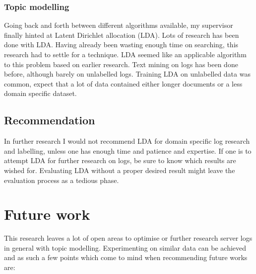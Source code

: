 \subsubsection{Topic modelling}
Going back and forth between different algorithms available, my supervisor finally hinted at Latent Dirichlet allocation (LDA). Lots of research has been done with LDA. Having already been wasting enough time on searching, this research had to settle for a technique. LDA seemed like an applicable algorithm to this problem based on earlier research. Text mining on logs has been done before, although barely on unlabelled logs. Training LDA on unlabelled data was common, expect that a lot of data contained either longer documents or a less domain specific dataset. 

\subsection{Recommendation}
In further research I would not recommend LDA for domain specific log research and labelling, unless one has enough time and patience and expertise. If one is to attempt LDA for further research on logs, be sure to know which results are wished for. Evaluating LDA without a proper desired result might leave the evaluation process as a tedious phase. 

\section{Future work}
This research leaves a lot of open areas to optimise or further research server logs in general with topic modelling. Experimenting on similar data can be achieved and as such a few points which come to mind when recommending future works are:

